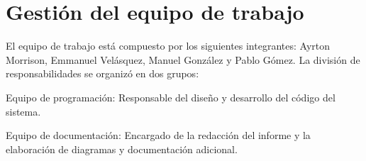 \section{Gestión del equipo de trabajo}
El equipo de trabajo está compuesto por los siguientes integrantes: Ayrton Morrison, Emmanuel Velásquez, Manuel González y Pablo Gómez. La división de responsabilidades se organizó en dos grupos:

Equipo de programación: Responsable del diseño y desarrollo del código del sistema.

Equipo de documentación: Encargado de la redacción del informe y la elaboración de diagramas y documentación adicional.